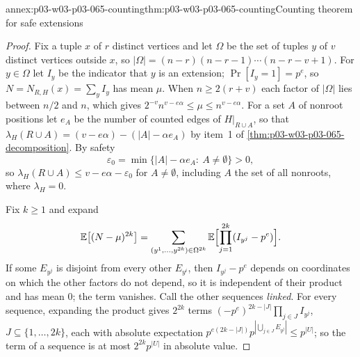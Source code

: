 \begin{annexitem}{annex:p03-w03-p03-065-counting}{thm:p03-w03-p03-065-counting}{Counting theorem for safe extensions}
\begin{proof}
Fix a tuple \(x\) of \(r\) distinct vertices and let \(\Omega\) be the set of
tuples \(y\) of \(v\) distinct vertices outside \(x\), so
\(|\Omega|=(n-r)(n-r-1)\cdots(n-r-v+1)\).  For \(y\in\Omega\) let \(I_y\) be
the indicator that \(y\) is an extension; \(\Pr[I_y=1]=p^e\), so
\(N=N_{R,H}(x)=\sum_yI_y\) has mean \(\mu\).  When \(n\geq2(r+v)\) each factor
of \(|\Omega|\) lies between \(n/2\) and \(n\), which gives
\(2^{-v}n^{v-e\alpha}\leq\mu\leq n^{v-e\alpha}\).  For a set \(A\) of
nonroot positions let \(e_A\) be the number of counted edges of
\(H|_{R\cup A}\), so that \(\lambda_H(R\cup A)=(v-e\alpha)-(|A|-\alpha e_A)\)
by item~1 of \cref{thm:p03-w03-p03-065-decomposition}.  By safety
\[
  \varepsilon_0=\min\{|A|-\alpha e_A:\ A\neq\emptyset\}>0 ,
\]
so \(\lambda_H(R\cup A)\leq v-e\alpha-\varepsilon_0\) for \(A\neq\emptyset\),
including \(A\) the set of all nonroots, where \(\lambda_H=0\).

Fix \(k\geq1\) and expand
\[
  \mathbb E\bigl[(N-\mu)^{2k}\bigr]
  =\sum_{(y^1,\ldots,y^{2k})\in\Omega^{2k}}
  \mathbb E\Bigl[\prod_{j=1}^{2k}(I_{y^j}-p^e)\Bigr].
\]
If some \(E_{y^j}\) is disjoint from every other \(E_{y^i}\), then
\(I_{y^j}-p^e\) depends on coordinates on which the other factors do not
depend, so it is independent of their product and has mean \(0\); the term
vanishes.  Call the other sequences \emph{linked}.  For every sequence,
expanding the product gives \(2^{2k}\) terms
\((-p^e)^{2k-|J|}\prod_{j\in J}I_{y^j}\), \(J\subseteq\{1,\ldots,2k\}\), each
with absolute expectation
\(p^{e(2k-|J|)}p^{|\bigcup_{j\in J}E_{y^j}|}\leq p^{|U|}\); so the term of a
sequence is at most \(2^{2k}p^{|U|}\) in absolute value.


\end{proof}
\end{annexitem}
